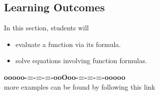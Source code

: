\documentclass{ximera}
\begin{document}
\subsection*{Learning Outcomes}

\begin{sectionOutcomes}
In this section, students will 

\begin{itemize}
\item evaluate a function via its formula.
\item solve equations involving function formulas.
\end{itemize}
\end{sectionOutcomes}
















\begin{center}
\textbf{\textcolor{green!50!black}{ooooo-=-=-=-ooOoo-=-=-=-ooooo}} \\

more examples can be found by following this link\\ 

\end{center}
\end{document}
